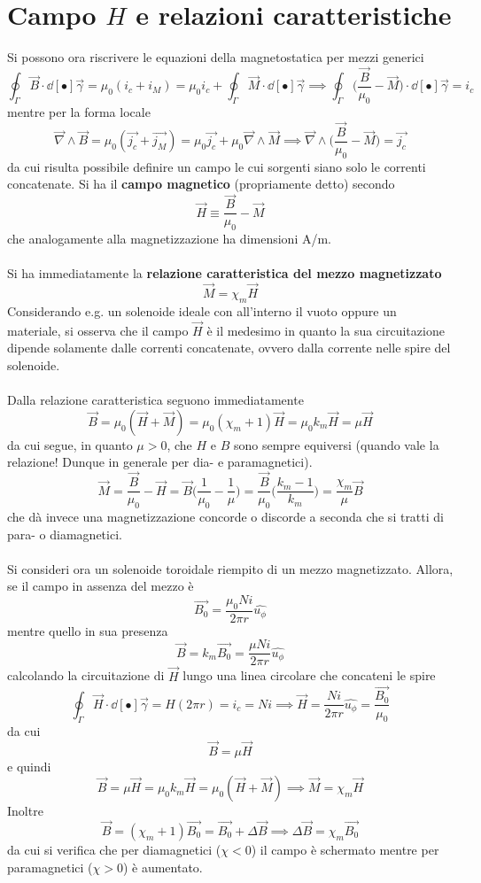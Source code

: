 \section{Campo $H$ e relazioni caratteristiche}
Si possono ora riscrivere le equazioni della magnetostatica per mezzi generici
\[\oint_\Gamma \vec{B} \cdot \dd[•]{\vec{\gamma}} = \mu_0 (i_c + i_M) = \mu_0 i_c + \oint_\Gamma \vec{M} \cdot \dd[•]{\vec{\gamma}} \implies \oint_\Gamma \big(\frac{\vec{B}}{\mu_0} - \vec{M}\big) \cdot \dd[•]{\vec{\gamma}} = i_c\]
mentre per la forma locale
\[\vec{\nabla} \wedge \vec{B} = \mu_0 (\vec{j_c} + \vec{j_M}) = \mu_0 \vec{j_c} + \mu_0 \vec{\nabla} \wedge \vec{M} \implies \vec{\nabla} \wedge \big(\frac{\vec{B}}{\mu_0} - \vec{M}\big) = \vec{j_c}\]
da cui risulta possibile definire un campo le cui sorgenti siano solo le correnti concatenate. Si ha il \textbf{campo magnetico} (propriamente detto) secondo
\[\vec{H} \equiv \frac{\vec{B}}{\mu_0} - \vec{M}\]
che analogamente alla magnetizzazione ha dimensioni A/m.
\\~\\
Si ha immediatamente la \textbf{relazione caratteristica del mezzo magnetizzato}
\[\vec{M} = \chi_m \vec{H}\]
Considerando e.g. un solenoide ideale con all'interno il vuoto oppure un materiale, si osserva che il campo $\vec{H}$ è il medesimo in quanto la sua circuitazione dipende solamente dalle correnti concatenate, ovvero dalla corrente nelle spire del solenoide.
\\~\\
Dalla relazione caratteristica seguono immediatamente
\[\vec{B} = \mu_0 (\vec{H} + \vec{M}) = \mu_0 (\chi_m + 1) \vec{H} = \mu_0 k_m \vec{H} = \mu \vec{H}\]
da cui segue, in quanto $\mu > 0$, che $H$ e $B$ sono sempre equiversi (quando vale la relazione! Dunque in generale per dia- e paramagnetici).
\[\vec{M} = \frac{\vec{B}}{\mu_0} - \vec{H} = \vec{B} \big(\frac{1}{\mu_0} - \frac{1}{\mu}\big) = \frac{\vec{B}}{\mu_0} \big(\frac{k_m - 1}{k_m}\big) = \frac{\chi_m}{\mu} \vec{B}\]
che dà invece una magnetizzazione concorde o discorde a seconda che si tratti di para- o diamagnetici.
\\~\\
Si consideri ora un solenoide toroidale riempito di un mezzo magnetizzato. Allora, se il campo in assenza del mezzo è
\[\vec{B_0} = \frac{\mu_0 N i}{2 \pi r} \hat{u_\phi}\]
mentre quello in sua presenza
\[\vec{B} = k_m \vec{B_0} = \frac{\mu N i}{2 \pi r} \hat{u_\phi}\]
calcolando la circuitazione di $\vec{H}$ lungo una linea circolare che concateni le spire
\[\oint_\Gamma \vec{H} \cdot \dd[•]{\vec{\gamma}} = H (2 \pi r) = i_c = N i \implies \vec{H}= \frac{N i}{2 \pi r} \hat{u_\phi} = \frac{\vec{B_0}}{\mu_0}\]
da cui
\[\vec{B} = \mu \vec{H}\]
e quindi
\[\vec{B} = \mu \vec{H} = \mu_0 k_m \vec{H} = \mu_0 (\vec{H} + \vec{M}) \implies \vec{M} = \chi_m \vec{H}\]
Inoltre
\[\vec{B} = (\chi_m + 1) \vec{B_0} = \vec{B_0} + \Delta \vec{B} \implies \Delta \vec{B} = \chi_m \vec{B_0}\]
da cui si verifica che per diamagnetici ($\chi < 0$) il campo è schermato mentre per paramagnetici ($\chi > 0$) è aumentato.

